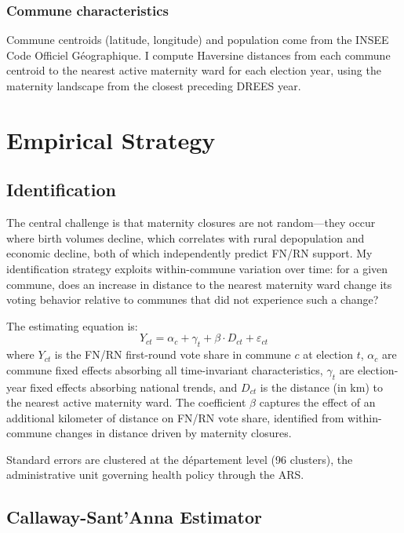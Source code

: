 \documentclass[12pt]{article}
\begin{document}
\subsubsection*{Commune characteristics} Commune centroids (latitude, longitude) and population come from the INSEE Code Officiel G\'{e}ographique. I compute Haversine distances from each commune centroid to the nearest active maternity ward for each election year, using the maternity landscape from the closest preceding DREES year.




\section{Empirical Strategy}

\subsection{Identification}

The central challenge is that maternity closures are not random---they occur where birth volumes decline, which correlates with rural depopulation and economic decline, both of which independently predict FN/RN support. My identification strategy exploits within-commune variation over time: for a given commune, does an increase in distance to the nearest maternity ward change its voting behavior relative to communes that did not experience such a change?

The estimating equation is:
\begin{equation}
\label{eq:main}
Y_{ct} = \alpha_c + \gamma_t + \beta \cdot D_{ct} + \varepsilon_{ct}
\end{equation}
where $Y_{ct}$ is the FN/RN first-round vote share in commune $c$ at election $t$, $\alpha_c$ are commune fixed effects absorbing all time-invariant characteristics, $\gamma_t$ are election-year fixed effects absorbing national trends, and $D_{ct}$ is the distance (in km) to the nearest active maternity ward. The coefficient $\beta$ captures the effect of an additional kilometer of distance on FN/RN vote share, identified from within-commune changes in distance driven by maternity closures.

Standard errors are clustered at the d\'{e}partement level (96 clusters), the administrative unit governing health policy through the ARS.

\subsection{Callaway-Sant'Anna Estimator}
\end{document}
